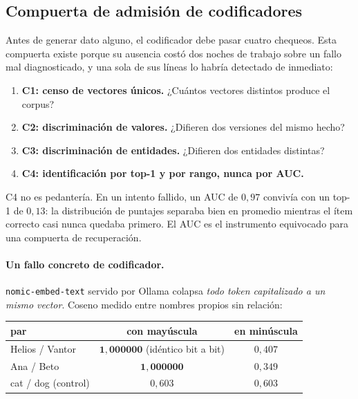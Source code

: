\documentclass[11pt,a4paper]{article}
\begin{document}
\subsection{Compuerta de admisión de codificadores}
\label{sec:gate}

Antes de generar dato alguno, el codificador debe pasar cuatro chequeos. Esta compuerta existe porque
su ausencia costó dos noches de trabajo sobre un fallo mal diagnosticado, y una sola de sus líneas lo
habría detectado de inmediato:

\begin{enumerate}
\item \textbf{C1: censo de vectores únicos.} ¿Cuántos vectores distintos produce el corpus?
\item \textbf{C2: discriminación de valores.} ¿Difieren dos versiones del mismo hecho?
\item \textbf{C3: discriminación de entidades.} ¿Difieren dos entidades distintas?
\item \textbf{C4: identificación por top-1 y por rango, nunca por AUC.}
\end{enumerate}

C4 no es pedantería. En un intento fallido, un AUC de $0{,}97$ convivía con un top-1 de $0{,}13$: la
distribución de puntajes separaba bien en promedio mientras el ítem correcto casi nunca quedaba
primero. El AUC es el instrumento equivocado para una compuerta de recuperación.

\paragraph{Un fallo concreto de codificador.} \texttt{nomic-embed-text} servido por Ollama colapsa
\emph{todo token capitalizado a un mismo vector}. Coseno medido entre nombres propios sin relación:

\begin{center}
\begin{tabular}{lcc}
\toprule
par & con mayúscula & en minúscula \\
\midrule
Helios / Vantor & $\mathbf{1{,}000000}$ (idéntico bit a bit) & $0{,}407$ \\
Ana / Beto      & $\mathbf{1{,}000000}$                       & $0{,}349$ \\
cat / dog (control) & $0{,}603$                               & $0{,}603$ \\
\bottomrule
\end{tabular}
\end{center}
\end{document}
